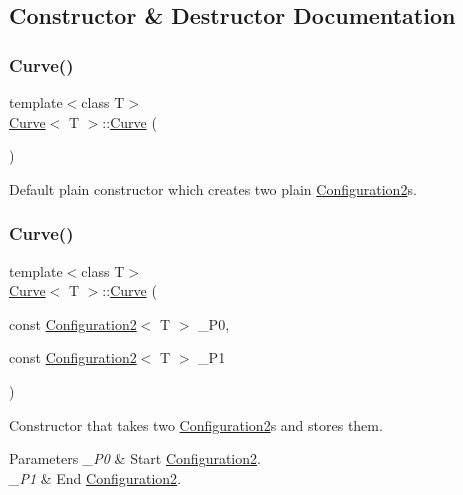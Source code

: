 \subsection{Constructor \& Destructor Documentation}
\mbox{\label{class_curve_a43ec90b53ea751c2df30ee3688af8a30}} 
\subsubsection{\texorpdfstring{Curve()}{Curve()}\hspace{0.1cm}{\footnotesize\ttfamily [1/4]}}
{\footnotesize\ttfamily template$<$class T$>$ \\
\mbox{\hyperlink{class_curve}{Curve}}$<$ T $>$\+::\mbox{\hyperlink{class_curve}{Curve}} (\begin{DoxyParamCaption}{ }\end{DoxyParamCaption})\hspace{0.3cm}{\ttfamily [inline]}}



Default plain constructor which creates two plain {\ttfamily \mbox{\hyperlink{class_configuration2}{Configuration2}}}s. 

\mbox{\label{class_curve_a5e4d06fa2e01878625e9f9c73f8d760b}} 
\subsubsection{\texorpdfstring{Curve()}{Curve()}\hspace{0.1cm}{\footnotesize\ttfamily [2/4]}}
{\footnotesize\ttfamily template$<$class T$>$ \\
\mbox{\hyperlink{class_curve}{Curve}}$<$ T $>$\+::\mbox{\hyperlink{class_curve}{Curve}} (\begin{DoxyParamCaption}\item[{const \mbox{\hyperlink{class_configuration2}{Configuration2}}$<$ T $>$}]{\+\_\+\+P0,  }\item[{const \mbox{\hyperlink{class_configuration2}{Configuration2}}$<$ T $>$}]{\+\_\+\+P1 }\end{DoxyParamCaption})\hspace{0.3cm}{\ttfamily [inline]}}

Constructor that takes two {\ttfamily \mbox{\hyperlink{class_configuration2}{Configuration2}}}s and stores them. 
\begin{DoxyParams}{Parameters}
{\em \+\_\+\+P0} & Start {\ttfamily \mbox{\hyperlink{class_configuration2}{Configuration2}}}. \\
\hline
{\em \+\_\+\+P1} & End {\ttfamily \mbox{\hyperlink{class_configuration2}{Configuration2}}}. \\
\hline
\end{DoxyParams}
\mbox{\label{class_curve_a8273498ecf9db747d2449fd0afc4702f}} 
